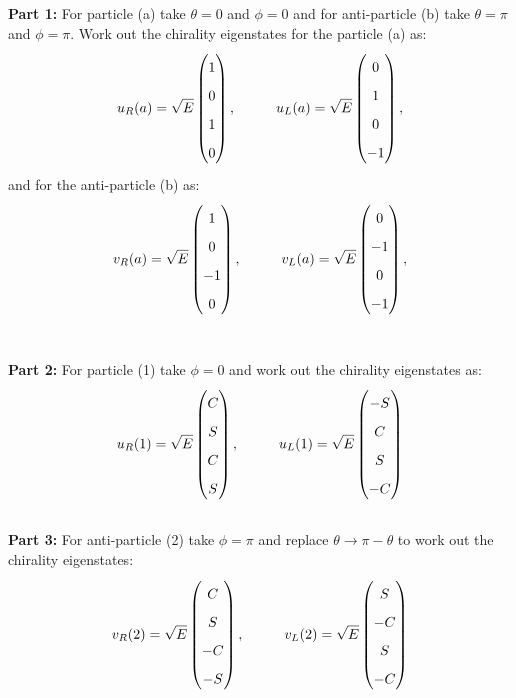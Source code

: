 \documentclass[12pt]{article}
\begin{document}
\noindent
{\bf Part 1:}  For particle (a) take $\theta=0$ and $\phi=0$ and for anti-particle (b) take $\theta=\pi$ and $\phi=\pi$.  Work out the chirality eigenstates for the particle (a) as:
$$\def\arraystretch{1.7}
u_R(a) = \sqrt{E} \begin{pmatrix} 1 \\ 0 \\ 1 \\ 0 \end{pmatrix}, \hspace{1cm}
u_L(a) = \sqrt{E} \begin{pmatrix} 0 \\ 1 \\ 0 \\ -1 \end{pmatrix},
$$
and for the anti-particle (b) as:
$$\def\arraystretch{1.7}
v_R(a) = \sqrt{E} \begin{pmatrix} 1 \\ 0 \\ -1 \\ 0 \end{pmatrix}, \hspace{1cm}
v_L(a) = \sqrt{E} \begin{pmatrix} 0 \\ -1 \\ 0 \\ -1 \end{pmatrix},
$$
~\\[5pt]

\newpage

\noindent
{\bf Part 2:}  For particle (1) take $\phi=0$ and work out the chirality eigenstates as:
$$\def\arraystretch{1.7}
u_R(1) = \sqrt{E} \begin{pmatrix}  C \\ S \\ C \\  S \end{pmatrix}, \hspace{1cm}
u_L(1) = \sqrt{E} \begin{pmatrix} -S \\ C \\ S \\ -C \end{pmatrix}
$$
~\\[5pt]

\noindent
{\bf Part 3:}  For anti-particle (2) take $\phi=\pi$ and replace $\theta \to \pi - \theta$ to work out the chirality eigenstates:
$$\def\arraystretch{1.7}
v_R(2) = \sqrt{E} \begin{pmatrix}  C \\  S \\ -C \\  -S \end{pmatrix}, \hspace{1cm}
v_L(2) = \sqrt{E} \begin{pmatrix}  S \\ -C \\  S \\  -C \end{pmatrix}
$$
~\\[5pt]
\end{document}
